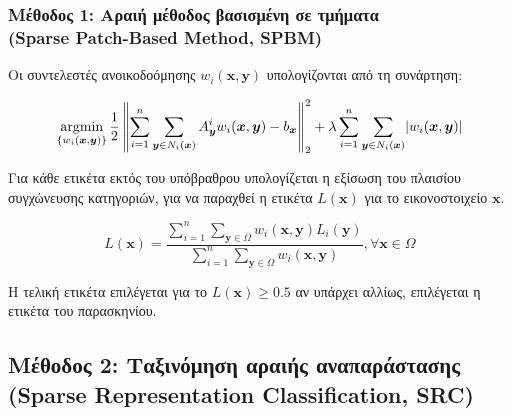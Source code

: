 \documentclass{beamer}
\newcommand{\argminB}{\mathop{\mathrm{argmin}}}
\DeclarePairedDelimiter\abs{\lvert}{\rvert}
\newcommand\norm[1]{\left\lVert#1\right\rVert}
\begin{document}
\begin{frame}
\frametitle{Μέθοδος 1: Αραιή μέθοδος βασισμένη σε τμήματα \\
(Sparse Patch-Based Method, SPBM)}

Οι συντελεστές ανοικοδοόμησης $w_i(\bm{x},\bm{y})$ υπολογίζονται από τη
συνάρτηση:

\begin{equation*}
    \argminB_{\{w_i(\bm{x},\bm{y})\}} { \frac{1} {2} \norm {\sum_{i=1}^{n}
    \sum_{\bm{y} \in N_i(\bm{x})} A_{\bm{y}}^i w_i(\bm{x},\bm{y}) -
    b_{\bm{x}}}_2^2 }
    + \lambda \sum_{i=1}^{n} \sum_{\bm{y} \in N_i(\bm{x})}
    \abs{w_i(\bm{x},\bm{y})}
\end{equation*}

Για κάθε ετικέτα εκτός του υπόβραθρου υπολογίζεται η εξίσωση του πλαισίου
συγχώνευσης κατηγοριών, για να παραχθεί η ετικέτα $L(\bm{x})$ για το
εικονοστοιχείο $\bm{x}$.

\begin{equation*}
    L(\bm{x})=\frac{ \sum_{i=1}^{n}  \sum_{\bm{y}\in\Omega}
                     w_i(\bm{x},\bm{y})L_i(\bm{y})}
    { \sum_{i=1}^{n}  \sum_{\bm{y}\in\Omega} w_i(\bm{x},\bm{y}) }
    , \forall \bm{x}\in\Omega
\end{equation*}

Η τελική ετικέτα επιλέγεται για το $L(\bm{x}) \geq 0.5$ αν υπάρχει αλλίως,
επιλέγεται η ετικέτα του παρασκηνίου.

\end{frame}


\subsection{Μέθοδος 2: Ταξινόμηση αραιής αναπαράστασης (Sparse Representation
Classification, SRC)}
\end{document}
